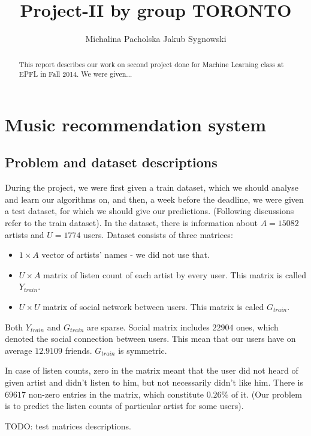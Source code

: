 \documentclass{article}
\title{Project-II by group TORONTO}
\author{Michalina Pacholska \And Jakub Sygnowski}
\begin{document}
\maketitle
\begin{abstract}
This report describes our work on second project done for Machine Learning class at EPFL in Fall 2014. We were given...
\end{abstract}
\section*{Music recommendation system}
\subsection*{Problem and dataset descriptions}
During the project, we were first given a train dataset, which we should analyse and learn our algorithms on, and then, a week before the deadline, we were given a test dataset, for which we should give our predictions. (Following discussions refer to the train dataset). In the dataset, there is information about $A=15082$ artists and $U=1774$ users. Dataset consists of three matrices:
\begin{itemize}
    \item $1\times A$ vector of artists' names - we did not use that.
    \item $U \times A$ matrix of listen count of each artist by every user. This matrix is called $Y_{train}$.
    \item $U \times U$ matrix of social network between users. This matrix is caled $G_{train}$.
\end{itemize}

Both $Y_{train}$ and $G_{train}$ are sparse. Social matrix includes $22904$ ones, which denoted the social connection between users. This mean that our users have on average $12.9109$ friends. $G_{train}$ is symmetric.

In case of listen counts, zero in the matrix meant that the user did not heard of given artist and didn't listen to him, but not necessarily didn't like him. There is $69617$ non-zero entries in the matrix, which constitute $0.26\%$ of it. (Our problem is to predict the listen counts of particular artist for some users).

TODO: test matrices descriptions.
\end{document}

